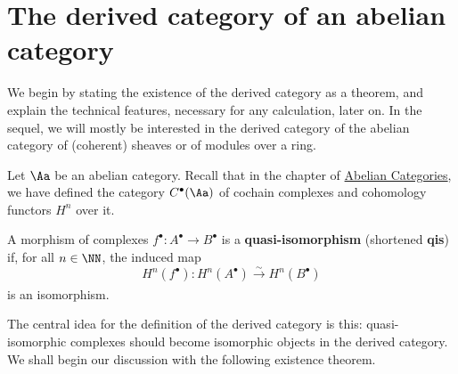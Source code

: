 
\section{The derived category of an abelian category}

We begin by stating the existence of the derived category 
as a theorem, and explain the technical features, 
necessary for any calculation, later on.
In the sequel, we will mostly be interested in 
the derived category of the abelian category of 
(coherent) sheaves or of modules over a ring. 

Let $\Aa$ be an abelian category.
Recall that in the chapter 
of \hyperref[AbelianCategories]{Abelian Categories},
we have defined the category $C^{\bullet}(\Aa)$
of cochain complexes and cohomology functors $H^{n}$
over it.

\begin{df}
    A morphism of complexes
    $f^{\bullet} : A^{\bullet} \to B^{\bullet}$
    is a \textbf{quasi-isomorphism} (shortened \textbf{qis})
    if, for all $n \in \NN$, the induced map
    \begin{equation*}
        H^{n}(f^{\bullet}) : H^{n}(A^{\bullet}) \xrightarrow[]{\sim} H^{n}(B^{\bullet})
    \end{equation*}
    is an isomorphism.
\end{df}

The central idea for the definition of the derived category is this: 
quasi-isomorphic complexes should become isomorphic objects 
in the derived category. 
We shall begin our discussion with the following existence theorem.

